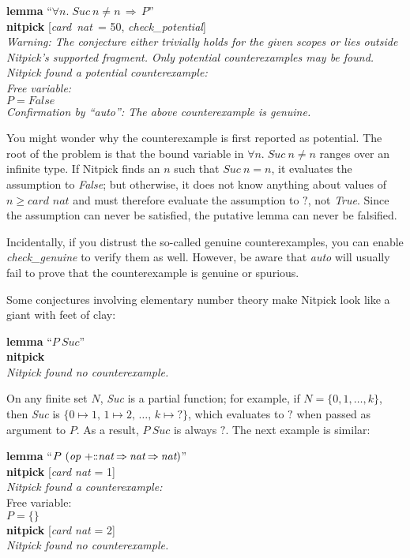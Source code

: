 \documentclass[a4paper,12pt]{article}
\def\Colon{\mathord{:\mkern-1.5mu:}}
\def\unk{{?}}
\begin{document}
\prew
\textbf{lemma} ``$\forall n.\; \textit{Suc}~n \mathbin{\not=} n \,\Longrightarrow\, P$'' \\
\textbf{nitpick} [\textit{card~nat}~= 50, \textit{check\_potential}] \\[2\smallskipamount]
\slshape Warning: The conjecture either trivially holds for the given scopes or lies outside Nitpick's supported
fragment. Only potential counterexamples may be found. \\[2\smallskipamount]
Nitpick found a potential counterexample: \\[2\smallskipamount]
\hbox{}\qquad Free variable: \nopagebreak \\
\hbox{}\qquad\qquad $P = \textit{False}$ \\[2\smallskipamount]
Confirmation by ``\textit{auto}'': The above counterexample is genuine.
\postw

You might wonder why the counterexample is first reported as potential. The root
of the problem is that the bound variable in $\forall n.\; \textit{Suc}~n
\mathbin{\not=} n$ ranges over an infinite type. If Nitpick finds an $n$ such
that $\textit{Suc}~n \mathbin{=} n$, it evaluates the assumption to
\textit{False}; but otherwise, it does not know anything about values of $n \ge
\textit{card~nat}$ and must therefore evaluate the assumption to $\unk$, not
\textit{True}. Since the assumption can never be satisfied, the putative lemma
can never be falsified.

Incidentally, if you distrust the so-called genuine counterexamples, you can
enable \textit{check\_\allowbreak genuine} to verify them as well. However, be
aware that \textit{auto} will usually fail to prove that the counterexample is
genuine or spurious.

Some conjectures involving elementary number theory make Nitpick look like a
giant with feet of clay:

\prew
\textbf{lemma} ``$P~\textit{Suc}$'' \\
\textbf{nitpick} \\[2\smallskipamount]
\slshape
Nitpick found no counterexample.
\postw

On any finite set $N$, \textit{Suc} is a partial function; for example, if $N =
\{0, 1, \ldots, k\}$, then \textit{Suc} is $\{0 \mapsto 1,\, 1 \mapsto 2,\,
\ldots,\, k \mapsto \unk\}$, which evaluates to $\unk$ when passed as
argument to $P$. As a result, $P~\textit{Suc}$ is always $\unk$. The next
example is similar:

\prew
\textbf{lemma} ``$P~(\textit{op}~{+}\Colon
\textit{nat}\mathbin{\Rightarrow}\textit{nat}\mathbin{\Rightarrow}\textit{nat})$'' \\
\textbf{nitpick} [\textit{card nat} = 1] \\[2\smallskipamount]
{\slshape Nitpick found a counterexample:} \\[2\smallskipamount]
\hbox{}\qquad Free variable: \nopagebreak \\
\hbox{}\qquad\qquad $P = \{\}$ \\[2\smallskipamount]
\textbf{nitpick} [\textit{card nat} = 2] \\[2\smallskipamount]
{\slshape Nitpick found no counterexample.}
\postw
\end{document}
